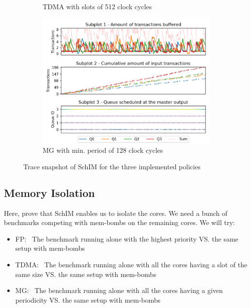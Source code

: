 \begin{figure}
\begin{subfigure}{0.5\textwidth}
        \caption{TDMA with slots of 512 clock cycles}
        \label{fig:schim_behaviour_tdma}
      \end{subfigure}
      \begin{subfigure}{0.5\textwidth}
        \centering
        \includegraphics[scale=0.55]{images/iladata_mg_3_128_128_3.png}
        \caption{MG with min. period of 128 clock cycles}
        \label{fig:schim_behaviour_mg}
      \end{subfigure}
      \caption{Trace snapshot of SchIM for the three implemented policies}
      \label{fig:schim_behaviour}
    \end{figure}

  \subsection{Memory Isolation}
    Here, prove that SchIM enables us to isolate the cores. We need a bunch of benchmarks competing with mem-bombs on the remaining cores. We will try:
    \begin{itemize}
      \item FP:~ The benchmark running alone with the highest priority VS. the same setup with mem-bombs
      \item TDMA:~ The benchmark running alone with all the cores having a slot of the same size VS. the same setup with mem-bombs
      \item MG:~ The benchmark running alone with all the cores having a given periodicity VS. the same setup with mem-bombs
    \end{itemize}
